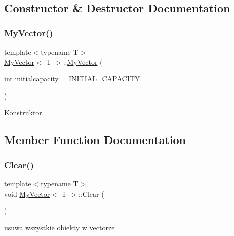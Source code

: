 \subsection{Constructor \& Destructor Documentation}
\mbox{\label{class_my_vector_a8fd71ac4f7522c6860dc859e9b46f4c9}} 
\subsubsection{\texorpdfstring{My\+Vector()}{MyVector()}}
{\footnotesize\ttfamily template$<$typename T$>$ \\
\hyperlink{class_my_vector}{My\+Vector}$<$ T $>$\+::\hyperlink{class_my_vector}{My\+Vector} (\begin{DoxyParamCaption}\item[{int}]{initialcapacity = {\ttfamily INITIAL\+\_\+CAPACITY} }\end{DoxyParamCaption})\hspace{0.3cm}{\ttfamily [inline]}}



Konstruktor. 



\subsection{Member Function Documentation}
\mbox{\label{class_my_vector_adc155c04c9e259a034f268788b39babd}} 
\subsubsection{\texorpdfstring{Clear()}{Clear()}}
{\footnotesize\ttfamily template$<$typename T$>$ \\
void \hyperlink{class_my_vector}{My\+Vector}$<$ T $>$\+::Clear (\begin{DoxyParamCaption}{ }\end{DoxyParamCaption})\hspace{0.3cm}{\ttfamily [inline]}}



usuwa wszystkie obiekty w vectorze 

\mbox{\label{class_my_vector_a6d3349a2cbf1ffd5965bfae2a7acd57c}} 
